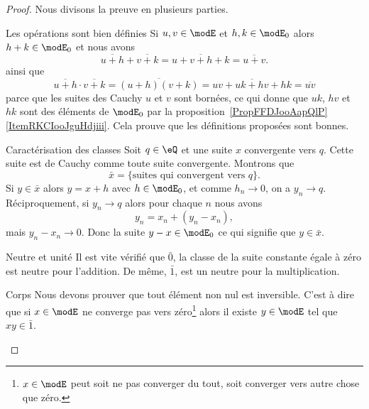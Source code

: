\begin{proof}
    Nous divisons la preuve en plusieurs parties.
    \begin{subproof}
    \item[Les opérations sont bien définies]
    Si \( u,v\in \modE\) et \( h,k\in \modE_0\) alors \( h+k\in\modE_0\) et nous avons
    \begin{equation}
        \overline{ u+h }+\overline{ v+k }=\overline{ u+v+h+k }=\overline{ u+v }.
    \end{equation}
    ainsi que
    \begin{equation}
        \overline{ u+h }\cdot \overline{ v+k }=\overline{ (u+h)(v+k) }=\overline{ uv+uk+hv+hk }=\overline{ uv }
    \end{equation}
    parce que les suites des Cauchy \( u\) et \( v\) sont bornées, ce qui donne que \( uk\), \( hv\) et \( hk\) sont des éléments de \( \modE_0\) par la proposition~\ref{PropFFDJooAapQlP}\ref{ItemRKCIooJguHdjiii}. Cela prouve que les définitions proposées sont bonnes.

    \item[Caractérisation des classes]
        Soit \( q\in \eQ\) et une suite \( x\) convergente vers \( q\). Cette suite est de Cauchy comme toute suite convergente. Montrons que
        \begin{equation}
            \bar x=\{ \text{suites qui convergent vers } q \}.
        \end{equation}
        Si \( y\in\bar x\) alors \( y=x+h\) avec \( h\in \modE_0\), et comme \( h_n\to 0\), on a \( y_n\to q\). Réciproquement, si \( y_n\to q\) alors pour chaque \( n\) nous avons
        \begin{equation}
            y_n=x_n+(y_n-x_n),
        \end{equation}
        mais \( y_n-x_n\to 0\). Donc la suite \( y-x\in\modE_0\) ce qui signifie que \( y\in\bar x\).
    \item[Neutre et unité]
        Il est vite vérifié que \( \bar 0\), la classe de la suite constante égale à zéro est neutre pour l'addition. De même, \( \bar 1\), est un neutre pour la multiplication.
    \item[Corps]
        Nous devons prouver que tout élément non nul est inversible. C'est à dire que si \( x\in\modE\) ne converge pas vers zéro\footnote{\( x\in\modE\) peut soit ne pas converger du tout, soit converger vers autre chose que zéro.} alors il existe \( y\in \modE\) tel que \( xy\in\bar 1\).


\end{subproof}
\end{proof}
